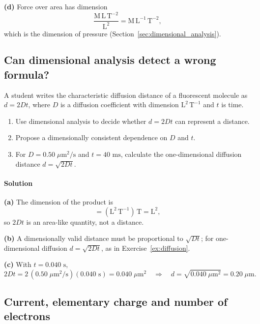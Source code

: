 \textbf{(d)} Force over area has dimension
\begin{equation*}
\frac{\text{M}\,\text{L}\,\text{T}^{-2}}{\text{L}^2} = \text{M}\,\text{L}^{-1}\,\text{T}^{-2},
\end{equation*}
which is the dimension of pressure (Section~\ref{sec:dimensional_analysis}).

\subsection{Can dimensional analysis detect a wrong formula?}
\label{ex:wrong_formula}

A student writes the characteristic diffusion distance of a fluorescent molecule as $d = 2Dt$, where $D$ is a diffusion coefficient with dimension $\text{L}^2\,\text{T}^{-1}$ and $t$ is time.
\begin{enumerate}[label=(\alph*)]
    \item Use dimensional analysis to decide whether $d = 2Dt$ can represent a distance.
    \item Propose a dimensionally consistent dependence on $D$ and $t$.
    \item For $D = 0.50\;\mu\text{m}^2/\text{s}$ and $t = 40\text{ ms}$, calculate the one-dimensional diffusion distance $d = \sqrt{2Dt}$.
\end{enumerate}

\paragraph{Solution} \textbf{(a)} The dimension of the product is
\begin{equation*}
[Dt] = (\text{L}^2\,\text{T}^{-1})\,\text{T} = \text{L}^2,
\end{equation*}
so $2Dt$ is an area-like quantity, not a distance.

\textbf{(b)} A dimensionally valid distance must be proportional to $\sqrt{Dt}$; for one-dimensional diffusion $d = \sqrt{2Dt}$, as in Exercise~\ref{ex:diffusion}.

\textbf{(c)} With $t = 0.040\text{ s}$,
\begin{equation*}
2Dt = 2\,(0.50\;\mu\text{m}^2/\text{s})(0.040\text{ s}) = 0.040\;\mu\text{m}^2 \quad \Longrightarrow \quad d = \sqrt{0.040\;\mu\text{m}^2} = 0.20\;\mu\text{m}.
\end{equation*}

\subsection{Current, elementary charge and number of electrons}
\label{ex:electrons}

